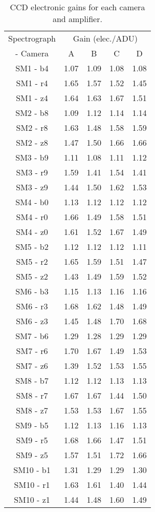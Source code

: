 \begin{table}
\centering
\small
\begin{tabular}{ccccc}
Spectrograph & \multicolumn{4}{c}{Gain (elec./ADU)} \\
- Camera & A & B & C & D \\
\hline
SM1 - b4 & 1.07 & 1.09 & 1.08 & 1.08\\
SM1 - r4 & 1.65 & 1.57 & 1.52 & 1.45\\
SM1 - z4 & 1.64 & 1.63 & 1.67 & 1.51\\
SM2 - b8 & 1.09 & 1.12 & 1.14 & 1.14\\
SM2 - r8 & 1.63 & 1.48 & 1.58 & 1.59\\
SM2 - z8 & 1.47 & 1.50 & 1.66 & 1.66\\
SM3 - b9 & 1.11 & 1.08 & 1.11 & 1.12\\
SM3 - r9 & 1.59 & 1.41 & 1.54 & 1.41\\
SM3 - z9 & 1.44 & 1.50 & 1.62 & 1.53\\
SM4 - b0 & 1.13 & 1.12 & 1.12 & 1.12\\
SM4 - r0 & 1.66 & 1.49 & 1.58 & 1.51\\
SM4 - z0 & 1.61 & 1.52 & 1.67 & 1.49\\
SM5 - b2 & 1.12 & 1.12 & 1.12 & 1.11\\
SM5 - r2 & 1.65 & 1.59 & 1.51 & 1.47\\
SM5 - z2 & 1.43 & 1.49 & 1.59 & 1.52\\
SM6 - b3 & 1.15 & 1.13 & 1.16 & 1.16\\
SM6 - r3 & 1.68 & 1.62 & 1.48 & 1.49\\
SM6 - z3 & 1.45 & 1.48 & 1.70 & 1.68\\
SM7 - b6 & 1.29 & 1.28 & 1.29 & 1.29\\
SM7 - r6 & 1.70 & 1.67 & 1.49 & 1.53\\
SM7 - z6 & 1.39 & 1.52 & 1.53 & 1.55\\
SM8 - b7 & 1.12 & 1.12 & 1.13 & 1.13\\
SM8 - r7 & 1.67 & 1.67 & 1.44 & 1.50\\
SM8 - z7 & 1.53 & 1.53 & 1.67 & 1.55\\
SM9 - b5 & 1.12 & 1.13 & 1.16 & 1.13\\
SM9 - r5 & 1.68 & 1.66 & 1.47 & 1.51\\
SM9 - z5 & 1.57 & 1.51 & 1.72 & 1.66\\
SM10 - b1 & 1.31 & 1.29 & 1.29 & 1.30\\
SM10 - r1 & 1.63 & 1.61 & 1.40 & 1.44\\
SM10 - z1 & 1.44 & 1.48 & 1.60 & 1.49\\
\end{tabular}
    \caption{CCD electronic gains for each camera and amplifier.}
    \label{table:spectrographs-ccd-gain-table}
    \end{table}
    
